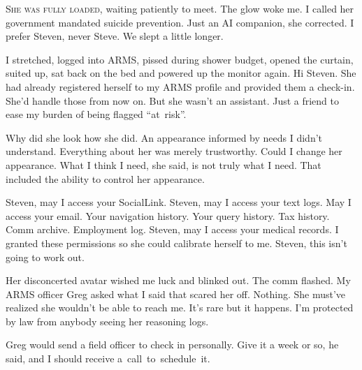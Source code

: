 
\lettrine{S}{he was fully loaded,} waiting patiently to meet. The glow woke me. I
called her government mandated suicide prevention. Just an AI companion,
she corrected. I prefer Steven, never Steve. We slept a little longer.

I stretched, logged into ARMS, pissed during shower budget, opened the
curtain, suited up, sat back on the bed and powered up the monitor
again. Hi Steven. She had already registered herself to my ARMS profile
and provided them a check-in. She'd handle those from now on. But she
wasn't an assistant. Just a friend to ease my burden of being flagged
\mbox{``at risk''.}

Why did she look how she did. An appearance informed by needs I didn't
understand. Everything about her was merely trustworthy. Could I change
her appearance. What I think I need, she said, is not truly what I need.
That included the ability to control her appearance.

Steven, may I access your SocialLink. Steven, may I access your text
logs. May I access your email. Your navigation history. Your query
history. Tax history. Comm archive. Employment log. Steven, may I access
your medical records. I granted these permissions so she could calibrate
herself to me. Steven, this isn't going to work out.

Her disconcerted avatar wished me luck and blinked out. The comm
flashed. My ARMS officer Greg asked what I said that scared her off.
Nothing. She must've realized she wouldn't be able to reach me. It's
rare but it happens. I'm protected by law from anybody seeing her
reasoning logs.

Greg would send a field officer to check in personally. Give it a week
or so, he said, and I should receive \mbox{a call to schedule it.}
